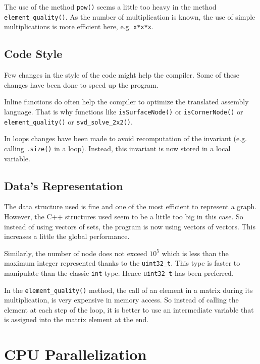 \documentclass[fleqn,11pt]{SelfArx} %
\begin{document}
The use of the method \verb+pow()+ seems a little too heavy in the method \verb+element_quality()+. As the number of multiplication is known, the use of simple multiplications is more efficient here, e.g. \verb+x*x*x+.

\subsection{Code Style}

Few changes in the style of the code might help the compiler. Some of these changes have been done to speed up the program.

Inline functions do often help the compiler to optimize the translated assembly language. That is why functions like \verb+isSurfaceNode()+ or \verb+isCornerNode()+ or \verb+element_quality()+ or \verb+svd_solve_2x2()+.

In loops changes have been made to avoid recomputation of the invariant (e.g. calling \verb+.size()+ in a loop). Instead, this invariant is now stored in a local variable.

\subsection{Data's Representation}

The data structure used is fine and one of the most efficient to represent a graph. However, the C++ structures used seem to be a little too big in this case. So instead of using vectors of sets, the program is now using vectors of vectors. This increases a little the global performance.

Similarly, the number of node does not exceed $10^5$ which is less than the maximum integer represented thanks to the \verb+uint32_t+. This type is faster to manipulate than the classic \verb+int+ type. Hence \verb+uint32_t+ has been preferred.

In the \verb+element_quality()+ method, the call of an element in a matrix during its multiplication, is very expensive in memory access. So instead of calling the element at each step of the loop, it is better to use an intermediate variable that is assigned into the matrix element at the end.


\section{CPU Parallelization}
\end{document}
